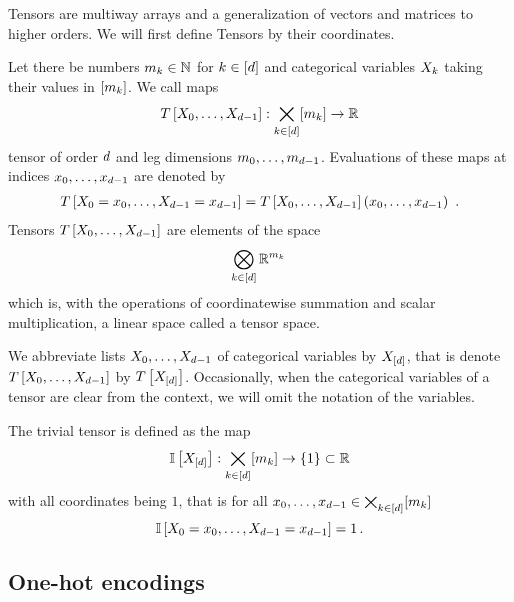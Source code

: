 Tensors are multiway arrays and a generalization of vectors and matrices to higher orders.
We will first define Tensors by their coordinates.

\begin{definition}[Tensor]\label{def:tensor}
	Let there be numbers $m_{k}\in\mathbb{N}$ for $k\in[d]$ and categorical variables $X_{k}$ taking their values in $[m_{k}]$.
	We call maps
	\begin{align*}
		T\left[X_{0},\ldots,X_{d-1}\right] : \bigtimes_{k\in[d]} [m_{k}] \rightarrow \mathbb{R}
	\end{align*}
	tensor of order $d$ and leg dimensions $m_{0},\ldots,m_{d-1}$.
	Evaluations of these maps at indices $x_{0},\ldots,x_{d-1}$ are denoted by
	\begin{align*}
		\hypercoreat{\indexedcatvariables} = \hypercoreat{\catvariables}(\catindices) \, .
	\end{align*}	
	Tensors $T\left[X_{0},\ldots,X_{d-1}\right]$ are elements of the space
	\begin{align*}
		\bigotimes_{k\in[d]} \mathbb{R}^{m_{k}} \,  
	\end{align*}
	which is, with the operations of coordinatewise summation and scalar multiplication, a linear space called a tensor space.
\end{definition} 

We abbreviate lists $X_{0},\ldots,X_{d-1}$ of categorical variables by $X_{[d]}$, that is denote $T\left[X_{0},\ldots,X_{d-1}\right]$ by $T\left[X_{[d]}\right]$.
Occasionally, when the categorical variables of a tensor are clear from the context, we will omit the notation of the variables. %


\begin{example}\label{exa:trivialTensor}
	The trivial tensor is defined as the map 
		\[ \mathbb{I}\left[X_{[d]}\right] : \bigtimes_{k\in[d]}[m_{k}] \rightarrow \{1\} \subset \mathbb{R} \]
	with all coordinates being $1$, that is for all $x_{0},\ldots,x_{d-1}\in\bigtimes_{k\in[d]}[m_{k}]$
		\[ \mathbb{I}\left[X_{0}=x_{0},\ldots,X_{d-1}=x_{d-1}\right] = 1 \, . \]
\end{example}


\subsection{One-hot encodings}

